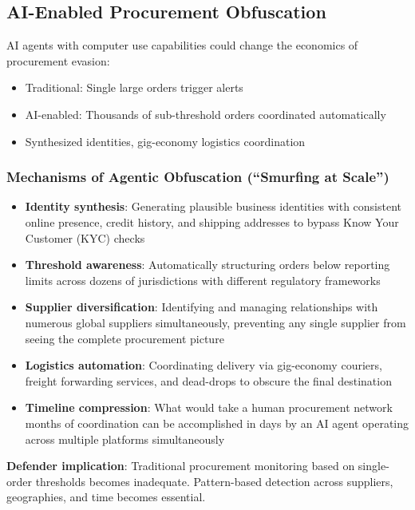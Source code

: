 \documentclass[11pt,letterpaper]{article}
\begin{document}
\subsection{AI-Enabled Procurement Obfuscation}

AI agents with computer use capabilities could change the economics of procurement evasion:
\begin{itemize}
  \item Traditional: Single large orders trigger alerts
  \item AI-enabled: Thousands of sub-threshold orders coordinated automatically
  \item Synthesized identities, gig-economy logistics coordination
\end{itemize}

\subsubsection*{Mechanisms of Agentic Obfuscation (``Smurfing at Scale'')}

\begin{itemize}
  \item \textbf{Identity synthesis}: Generating plausible business identities with consistent online presence, credit history, and shipping addresses to bypass Know Your Customer (KYC) checks
  \item \textbf{Threshold awareness}: Automatically structuring orders below reporting limits across dozens of jurisdictions with different regulatory frameworks
  \item \textbf{Supplier diversification}: Identifying and managing relationships with numerous global suppliers simultaneously, preventing any single supplier from seeing the complete procurement picture
  \item \textbf{Logistics automation}: Coordinating delivery via gig-economy couriers, freight forwarding services, and dead-drops to obscure the final destination
  \item \textbf{Timeline compression}: What would take a human procurement network months of coordination can be accomplished in days by an AI agent operating across multiple platforms simultaneously
\end{itemize}

\textbf{Defender implication}: Traditional procurement monitoring based on single-order thresholds becomes inadequate. Pattern-based detection across suppliers, geographies, and time becomes essential.
\end{document}
